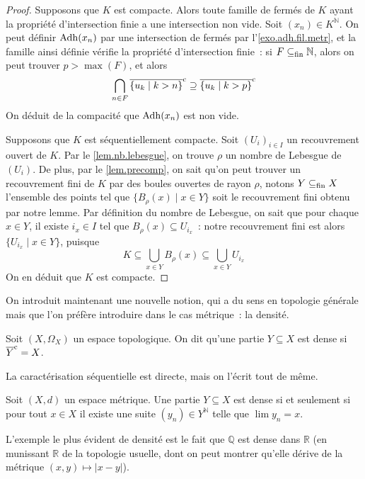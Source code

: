 \begin{proof}
  Supposons que $K$ est compacte. Alors toute famille de fermés de $K$ ayant
  la propriété d'intersection finie a une intersection non vide. Soit
  $(x_n)\in K^{\mathbb N}$. On peut définir
  $\operatorname{Adh}(x_n)$ par une intersection de fermés par l'\cref{exo.adh.fil.metr}, et
  la famille ainsi définie vérifie la propriété d'intersection finie~: si
  $F\subseteq_{\mathrm{fin}} \mathbb N$, alors on peut trouver $p > \max(F)$, et alors
  \[\bigcap_{n \in F}\overline{\{u_k\mid k > n\}}^{\mathrm c} \supseteq
  \overline{\{u_k\mid k > p\}}^{\mathrm c}\]
  On déduit de la compacité que $\operatorname{Adh}(x_n)$ est non vide.
  
  Supposons que $K$ est séquentiellement compacte. Soit $(U_i)_{i\in I}$ un
  recouvrement ouvert de $K$. Par le \cref{lem.nb.lebesgue}, on trouve $\rho$ un
  nombre de Lebesgue de $(U_i)$. De plus, par le \cref{lem.precomp}, on sait
  qu'on peut trouver un recouvrement fini de $K$ par des boules ouvertes de
  rayon $\rho$, notons $Y \subseteq_{\mathrm{fin}} X$ l'ensemble des points tel que
  $\{B_\rho(x)\mid x \in Y\}$ soit le recouvrement fini obtenu par notre lemme.
  Par définition du nombre de Lebesgue, on sait que pour chaque $x \in Y$, il
  existe $i_x \in I$ tel que $B_\rho(x) \subseteq U_{i_x}$~: notre recouvrement
  fini est alors $\{U_{i_x}\mid x \in Y\}$, puisque
  \[K\subseteq \bigcup_{x \in Y} B_\rho(x) \subseteq \bigcup_{x \in Y} U_{i_x}\]
  On en déduit que $K$ est compacte.
\end{proof}

On introduit maintenant une nouvelle notion, qui a du sens en topologie générale
mais que l'on préfère introduire dans le cas métrique~: la densité.

\begin{definition}[Densité]
  Soit $(X,\Omega_X)$ un espace topologique. On dit qu'une partie
  $Y\subseteq X$ est dense si $\overline{Y}^{\mathrm c} = X$.
\end{definition}

La caractérisation séquentielle est directe, mais on l'écrit tout de même.

\begin{property}
  Soit $(X,d)$ un espace métrique. Une partie $Y\subseteq X$ est dense si et
  seulement si pour tout $x\in X$ il existe une suite $(y_n)\in Y^\mathbb N$
  telle que $\lim y_n = x$.
\end{property}

\begin{example}
  L'exemple le plus évident de densité est le fait que $\mathbb Q$ est dense
  dans $\mathbb R$ (en munissant $\mathbb R$ de la topologie usuelle, dont on
  peut montrer qu'elle dérive de la métrique $(x,y)\mapsto |x-y|$).
\end{example}

